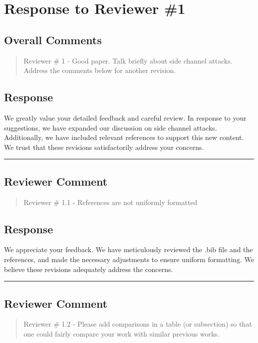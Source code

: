\section{Response to Reviewer \#1}
\subsection*{Overall Comments}
\begin{mdframed}
	\begin{quote}
		Reviewer \# 1 - Good paper. Talk briefly about side channel attacks. Address the comments below for another revision.
	\end{quote}
\end{mdframed}

\subsection{Response}

We greatly value your detailed feedback and careful review. In response to your suggestions, we have expanded our discussion on side channel attacks. Additionally, we have included relevant references to support this new content. We trust that these revisions satisfactorily address your concerns.

\noindent\rule{\linewidth}{2.0pt}

\subsection{Reviewer Comment}
\begin{mdframed}
	\begin{quote}
		Reviewer \# 1.1 - References are not uniformly formatted
	\end{quote}
\end{mdframed}

\subsection{Response}
We appreciate your feedback. We have meticulously reviewed the .bib file and the references, and made the necessary adjustments to ensure uniform formatting. We believe these revisions adequately address the concerns.

\noindent\rule{\linewidth}{2.0pt}

\subsection{Reviewer Comment}
\begin{mdframed}
	\begin{quote}
		Reviewer \# 1.2 - Please add comparisons in a table (or subsection) so that one could fairly compare your work with similar previous works.
	\end{quote}
\end{mdframed}

